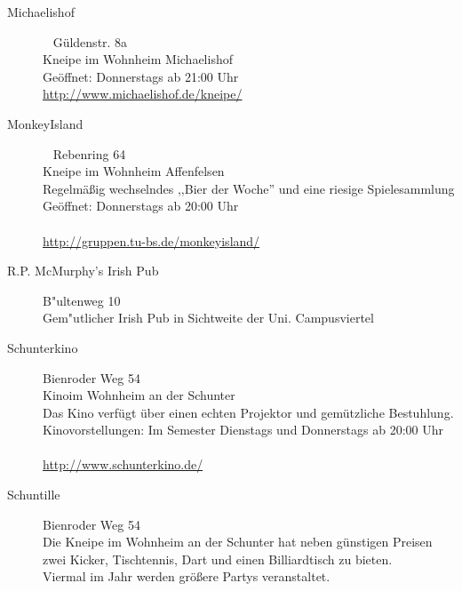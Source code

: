 \begin{description}
\item[Michaelishof]~ \hfill Güldenstr. 8a\\
  Kneipe im Wohnheim Michaelishof\\
  Geöffnet: Donnerstags ab 21:00 Uhr\\
  \url{http://www.michaelishof.de/kneipe/}
\item[MonkeyIsland]~ \hfill Rebenring 64\\
  Kneipe im Wohnheim Affenfelsen\\
  Regelmäßig wechselndes ,,Bier der Woche'' und eine riesige
  Spielesammlung\\
  Geöffnet: Donnerstags ab 20:00 Uhr\\
  \\\url{http://gruppen.tu-bs.de/monkeyisland/}
\item[R.P. McMurphy's Irish Pub] \hfill B"ultenweg 10\\
Gem"utlicher Irish Pub in Sichtweite der Uni.
Campusviertel
 \item[Schunterkino] \small{Bienroder Weg 54}\\
   \normalsize
   Kinoim Wohnheim an der Schunter\\
   Das Kino verfügt über einen echten Projektor und gemützliche
   Bestuhlung.\\
   Kinovorstellungen: Im Semester Dienstags und Donnerstags ab 20:00 Uhr\\
   \\\url{http://www.schunterkino.de/}\\
 \item[Schuntille] \small{Bienroder Weg 54}\\
   \normalsize
 Die    Kneipe im Wohnheim an der Schunter 
  hat neben    günstigen Preisen zwei Kicker, Tischtennis, Dart und einen
   Billiardtisch zu bieten.\\
   Viermal im Jahr werden größere Partys veranstaltet.\\

\end{description}

